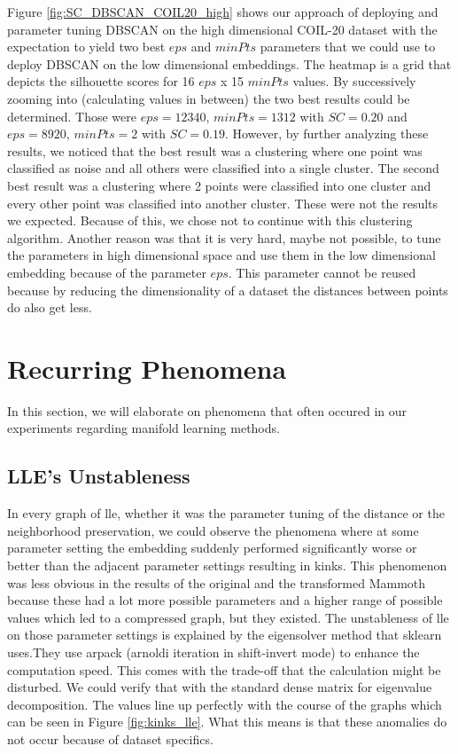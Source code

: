 Figure \ref{fig:SC_DBSCAN_COIL20_high} shows our approach of deploying and parameter tuning DBSCAN on the high dimensional COIL-20 dataset with the expectation to yield two best $eps$ and $minPts$ parameters that we could use to deploy DBSCAN on the low dimensional embeddings. The heatmap is a grid that depicts the silhouette scores for 16 $eps$ x 15 $minPts$ values. By successively zooming into (calculating values in between) the two best results could be determined. Those were $eps=12340$, $minPts=1312$ with $SC=0.20$ and $eps=8920$, $minPts=2$ with $SC=0.19$. However, by further analyzing these results, we noticed that the best result was a clustering where one point was classified as noise and all others were classified into a single cluster. The second best result was a clustering where 2 points were classified into one cluster and every other point was classified into another cluster. These were not the results we expected. Because of this, we chose not to continue with this clustering algorithm. Another reason was that it is very hard, maybe not possible, to tune the parameters in high dimensional space and use them in the low dimensional embedding because of the parameter $eps$. This parameter cannot be reused because by reducing the dimensionality of a dataset the distances between points do also get less.

\newpage

\section{Recurring Phenomena} \label{sec:rec_phen}

In this section, we will elaborate on phenomena that often occured in our experiments regarding manifold learning methods.

\subsection{LLE's Unstableness}

In every graph of lle, whether it was the parameter tuning of the distance or the neighborhood preservation, we could observe the phenomena where at some parameter setting the embedding suddenly performed significantly worse or better than the adjacent parameter settings resulting in kinks. This phenomenon was less obvious in the results of the original and the transformed Mammoth because these had a lot more possible parameters and a higher range of possible values which led to a compressed graph, but they existed.
The unstableness of lle on those parameter settings is explained by the eigensolver method that sklearn uses.\footnotemark They use arpack (arnoldi iteration in shift-invert mode) to enhance the computation speed. This comes with the trade-off that the calculation might be disturbed. We could verify that with the standard dense matrix for eigenvalue decomposition. The values line up perfectly with the course of the graphs which can be seen in Figure \ref{fig:kinks_lle}. What this means is that these anomalies do not occur because of dataset specifics.

